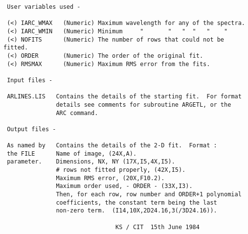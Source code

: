\begin{description}
\begin{verbatim}
 User variables used -

 (<) IARC_WMAX   (Numeric) Maximum wavelength for any of the spectra.
 (<) IARC_WMIN   (Numeric) Minimum     "       "   "  "   "    "
 (<) NOFITS      (Numeric) The number of rows that could not be fitted.
 (<) ORDER       (Numeric) The order of the original fit.
 (<) RMSMAX      (Numeric) Maximum RMS error from the fits.

 Input files -

 ARLINES.LIS   Contains the details of the starting fit.  For format
               details see comments for subroutine ARGETL, or the
               ARC command.

 Output files -

 As named by   Contains the details of the 2-D fit.  Format :
 the FILE      Name of image, (24X,A).
 parameter.    Dimensions, NX, NY (17X,I5,4X,I5).
               # rows not fitted properly, (42X,I5).
               Maximum RMS error, (20X,F10.2).
               Maximum order used, - ORDER - (33X,I3).
               Then, for each row, row number and ORDER+1 polynomial
               coefficients, the constant term being the last
               non-zero term.  (I14,10X,2D24.16,3(/3D24.16)).

                                KS / CIT  15th June 1984
\end{verbatim}
\end{description}
